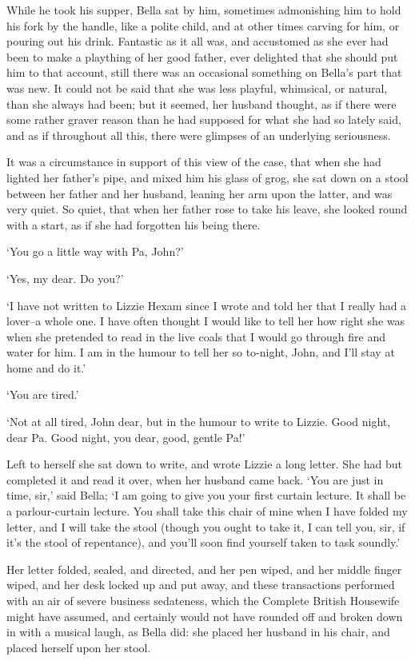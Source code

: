 While he took his supper, Bella sat by him, sometimes admonishing him
to hold his fork by the handle, like a polite child, and at other times
carving for him, or pouring out his drink. Fantastic as it all was, and
accustomed as she ever had been to make a plaything of her good father,
ever delighted that she should put him to that account, still there was
an occasional something on Bella’s part that was new. It could not be
said that she was less playful, whimsical, or natural, than she always
had been; but it seemed, her husband thought, as if there were some
rather graver reason than he had supposed for what she had so lately
said, and as if throughout all this, there were glimpses of an
underlying seriousness.

It was a circumstance in support of this view of the case, that when she
had lighted her father’s pipe, and mixed him his glass of grog, she sat
down on a stool between her father and her husband, leaning her arm upon
the latter, and was very quiet. So quiet, that when her father rose to
take his leave, she looked round with a start, as if she had forgotten
his being there.

‘You go a little way with Pa, John?’

‘Yes, my dear. Do you?’

‘I have not written to Lizzie Hexam since I wrote and told her that I
really had a lover--a whole one. I have often thought I would like to
tell her how right she was when she pretended to read in the live coals
that I would go through fire and water for him. I am in the humour to
tell her so to-night, John, and I’ll stay at home and do it.’

‘You are tired.’

‘Not at all tired, John dear, but in the humour to write to Lizzie. Good
night, dear Pa. Good night, you dear, good, gentle Pa!’

Left to herself she sat down to write, and wrote Lizzie a long letter.
She had but completed it and read it over, when her husband came back.
‘You are just in time, sir,’ said Bella; ‘I am going to give you your
first curtain lecture. It shall be a parlour-curtain lecture. You shall
take this chair of mine when I have folded my letter, and I will take
the stool (though you ought to take it, I can tell you, sir, if it’s
the stool of repentance), and you’ll soon find yourself taken to task
soundly.’

Her letter folded, sealed, and directed, and her pen wiped, and her
middle finger wiped, and her desk locked up and put away, and these
transactions performed with an air of severe business sedateness, which
the Complete British Housewife might have assumed, and certainly would
not have rounded off and broken down in with a musical laugh, as Bella
did: she placed her husband in his chair, and placed herself upon her
stool.

